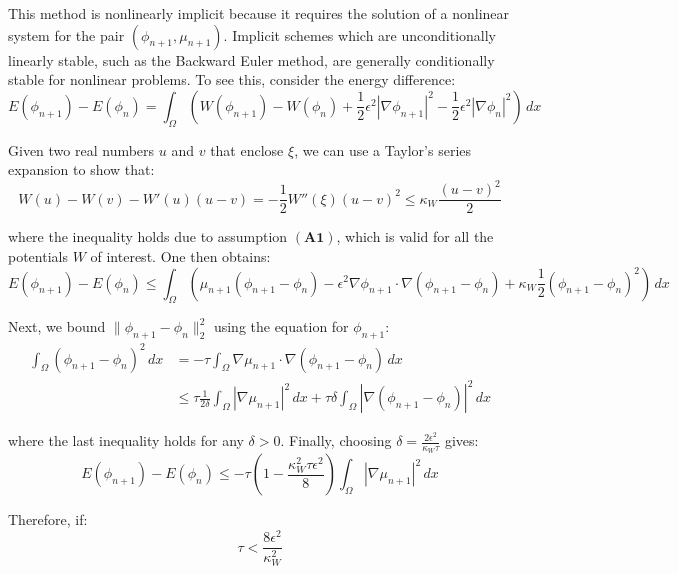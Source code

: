 \documentclass{article}
\begin{document}
This method is nonlinearly implicit because it requires the solution of a nonlinear system for the pair $(\phi_{n+1}, \mu_{n+1})$. Implicit schemes which are unconditionally linearly stable, such as the Backward Euler method, are generally conditionally stable for nonlinear problems. To see this, consider the energy difference:
\begin{equation}
    E(\phi_{n+1}) - E(\phi_n) = \int_{\Omega} \left(W(\phi_{n+1}) - W(\phi_n) + \frac{1}{2} \epsilon^2 |\nabla \phi_{n+1}|^2 - \frac{1}{2} \epsilon^2 |\nabla \phi_n|^2\right) \, dx
\end{equation}

Given two real numbers $u$ and $v$ that enclose $\xi$, we can use a Taylor's series expansion to show that:
\begin{equation}
    W(u) - W(v) - W'(u)(u - v) = -\frac{1}{2} W''(\xi)(u - v)^2 \leq \kappa_W \frac{(u - v)^2}{2}
\end{equation}

where the inequality holds due to assumption $\mathbf{(A1)}$, which is valid for all the potentials $W$ of interest. One then obtains:
\begin{equation}
    E(\phi_{n+1}) - E(\phi_n) \leq \int_{\Omega} \left(\mu_{n+1}(\phi_{n+1} - \phi_n) - \epsilon^2 \nabla \phi_{n+1} \cdot \nabla(\phi_{n+1} - \phi_n) + \kappa_W \frac{1}{2} (\phi_{n+1} - \phi_n)^2\right) \, dx
\end{equation}

Next, we bound $\|\phi_{n+1} - \phi_n\|_2^2$ using the equation for $\phi_{n+1}$:
\begin{align}
    \int_{\Omega} (\phi_{n+1} - \phi_n)^2 \, dx &= -\tau \int_{\Omega} \nabla \mu_{n+1} \cdot \nabla(\phi_{n+1} - \phi_n) \, dx \\
    &\leq \tau \frac{1}{2\delta} \int_{\Omega} |\nabla \mu_{n+1}|^2 \, dx + \tau \delta \int_{\Omega} |\nabla(\phi_{n+1} - \phi_n)|^2 \, dx
\end{align}

where the last inequality holds for any $\delta > 0$. Finally, choosing $\delta = \frac{2\epsilon^2}{\kappa_W\tau}$ gives:
\begin{equation}
    E(\phi_{n+1}) - E(\phi_n) \leq -\tau \left(1 - \frac{\kappa_W^2\tau\epsilon^2}{8}\right) \int_{\Omega} |\nabla \mu_{n+1}|^2 \, dx
\end{equation}

Therefore, if:
\begin{equation}
    \tau < \frac{8\epsilon^2}{\kappa_W^2}
\end{equation}
\end{document}
